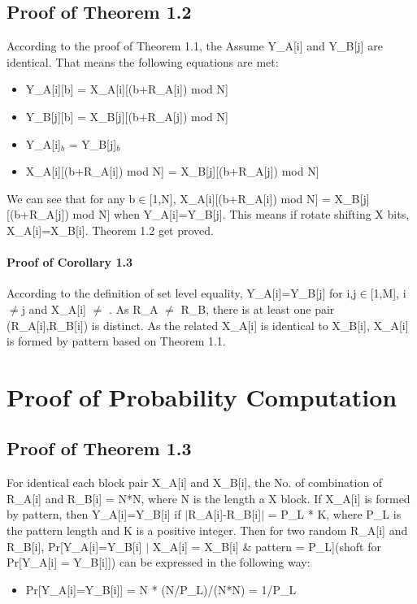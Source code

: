 \documentclass{article}
\begin{document}
\subsection{Proof of Theorem 1.2}
According to the proof of Theorem 1.1, the 
Assume Y\_A[i] and Y\_B[j] are identical.  That means the following equations are met:
\begin{itemize}
	\item Y\_A[i][b] = X\_A[i][(b+R\_A[i]) mod N] 
	\item Y\_B[j][b] = X\_B[j][(b+R\_A[j]) mod N]
	\item Y\_A[i]$_b$ = Y\_B[j]$_b$  
	\item X\_A[i][(b+R\_A[i]) mod N] = X\_B[j][(b+R\_A[j]) mod N]    
\end{itemize} 
We can see that for any b$\in$[1,N], X\_A[i][(b+R\_A[i]) mod N] = X\_B[j][(b+R\_A[j]) mod N] when Y\_A[i]=Y\_B[j]. This means if rotate shifting X bits, X\_A[i]=X\_B[i]. Theorem 1.2 get proved.
 

\paragraph{Proof of Corollary 1.3}
According to the definition of set level equality, Y\_A[i]=Y\_B[j] for i,j$\in$[1,M], i$\neq$j and X\_A[i] $\neq$ . As R\_A $\neq$ R\_B, there is at least one pair (R\_A[i],R\_B[i]) is distinct. As the related X\_A[i] is identical to X\_B[i], X\_A[i] is formed by pattern based on Theorem 1.1.
\section{Proof of Probability Computation}

\subsection{Proof of Theorem 1.3}
For identical each block pair X\_A[i] and X\_B[i], the No. of combination of R\_A[i] and R\_B[i] = N*N, where N is the length a X block. 
If X\_A[i] is formed by pattern, then Y\_A[i]=Y\_B[i] if $\mid$R\_A[i]-R\_B[i]$\mid$ = P\_L * K, where P\_L is the pattern length and K is a positive integer. 
Then for two random R\_A[i] and R\_B[i], Pr[Y\_A[i]=Y\_B[i] $\mid$ X\_A[i] = X\_B[i] \& pattern = P\_L](shoft for Pr[Y\_A[i] = Y\_B[i]]) can be expressed in the following way:
\begin{itemize}
	\item Pr[Y\_A[i]=Y\_B[i]] = N * (N/P\_L)/(N*N) = 1/P\_L
\end{itemize} 
\end{document}
